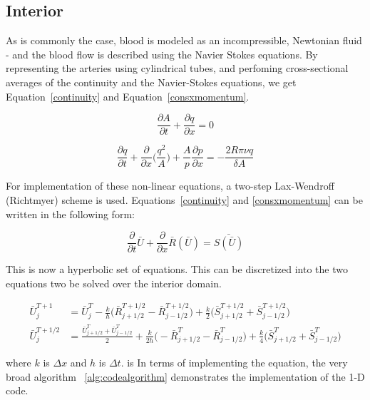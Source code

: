 \documentclass[12pt]{article}
\newcommand{\partder}[2]{\frac{\partial #1}{\partial #2}}
\newcommand{\tensor}[1]{\bar{#1}}
\newcommand{\tensplus}[3]{\tensor{#1}_{#2}^{#3}}
\begin{document}
\subsection{Interior}
As is commonly the case, blood is modeled as an incompressible, Newtonian fluid - and the blood flow is described using the Navier Stokes equations. By representing the arteries using cylindrical tubes, and perfoming cross-sectional averages of the continuity and the Navier-Stokes equations, we get Equation~\eqref{continuity} and Equation~\eqref{consxmomentum}.

\begin{equation}
	\label{continuity}
	\partder{A}{t} + \partder{q}{x} = 0
\end{equation}

\begin{equation}
	\label{consxmomentum}
	\partder{q}{t} + \partder{}{x}\Bigg(\frac{q^2}{A}\Bigg) + \frac{A}{p}\partder{p}{x} = -\frac{2R\pi \nu q}{\delta A}
\end{equation}

For implementation of these non-linear equations, a two-step Lax-Wendroff (Richtmyer) scheme is used. Equations~\ref{continuity} and \ref{consxmomentum} can be written in the following form:

\begin{equation} 
	\label{discrete1}
	\partder{}{t} \tensor{U} + \partder{}{x} \tensor{R}(\tensor{U}) = \tensor{S(\tensor{U})}
\end{equation}

This is now a hyperbolic set of equations. This can be discretized into the two equations two be solved over the interior domain. 

\begin{align}
		\tensplus{U}{j}{T+1} &= \tensplus{U}{j}{T} - \frac{k}{h} \Bigg(\tensplus{R}{j+1/2}{T+1/2} - \tensplus{R}{j-1/2}{T+1/2} \Bigg) + \frac{k}{2} \Bigg(\tensplus{S}{j		+1/2}{T+1/2} + \tensplus{S}{j-1/2}{T+1/2} \Bigg)   \label{bigu1}\\	
		\tensplus{U}{j}{T+1/2} &= \frac{\tensplus{U}{j+1/2}{T} + \tensplus{U}{j-1/2}{T}}{2} + \frac{k}{2h} \Bigg(-\tensplus{R}{j+1/2}{T} - \tensplus{R}{j-1/2}{T} \Bigg)  		+ \frac{k}{4} \Bigg(\tensplus{S}{j+1/2}{T} + \tensplus{S}{j-1/2}{T} \Bigg)
		\label{bigu2}
\end{align}

where $k$ is $\Delta x$ and $h$ is $\Delta t$. is In terms of implementing the equation, the very broad algorithm ~\ref{alg:codealgorithm} demonstrates the implementation of the 1-D code. 
\end{document}
